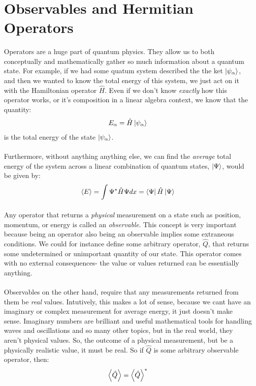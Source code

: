 \documentclass[12pt,letterpaper]{book}
\begin{document}

\section{Observables and Hermitian Operators}

\paragraph*{}Operators are a huge part of quantum physics. They allow us to both conceptually and mathematically gather so much information about a quantum state. For example, if we had some quatum system described the the ket 
$\ket{\psi_\alpha}$, and then we wanted to know the total energy of this system, we just act on it with the Hamiltonian operator $\hat{H}$. Even if we don't know \textit{exactly} how this operator works, or it's composition in a linear algebra context, we know that the quantity:
\begin{equation}
E_\alpha = \hat{H}\ket{\psi_\alpha}
\end{equation}
is the total energy of the state $\ket{\psi_\alpha}$.
\paragraph*{}Furthermore, without anything anything else, we can find the \textit{average} total energy of the system across a linear combination of quantum states, $\ket{\Psi}$, would be given by:
\begin{equation}
\label{expect-val}
\expval{E} = \int \Psi^* \hat{H} \Psi dx = \bra{\Psi}\hat{H}\ket{\Psi}	
\end{equation}
\paragraph*{}Any operator that returns a \textit{physical} measurement on a state such as position, momentum, or energy is called an \textit{observable}. This concept is very important because being an operator also being an observable implies some extraneous conditions. We could for instance define some arbitrary operator, $\hat{Q}$, that returns some undetermined or unimportant quantity of our state. This operator comes with no external consequences- the value or values returned can be essentially anything.
\paragraph*{}Observables on the other hand, require that any measurements returned from them be \textit{real} values. Intutively, this makes a lot of sense, because we cant have an imaginary or complex measurement for average energy, it just doesn't make sense. Imaginary numbers are brilliant and useful mathematical tools for handling waves and oscillations and so many other topics, but in the real world, they aren't physical values. So, the outcome of a physical measurement, but be a physically realistic value, it must be real. So if $\hat{Q}$ is some arbitrary observable operator, then:
\begin{equation}
\label{observable}
\expval{\hat{Q}} = \expval{\hat{Q}}^* 
\end{equation}
\end{document}
